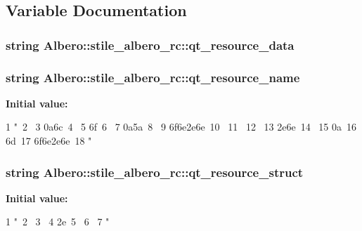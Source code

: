 \subsection{Variable Documentation}
\hypertarget{namespaceAlbero_1_1stile__albero__rc_ac54f331156bbcd4a77eb771964b081a0}{
\subsubsection[{qt\_\-resource\_\-data}]{\setlength{\rightskip}{0pt plus 5cm}string {\bf Albero::stile\_\-albero\_\-rc::qt\_\-resource\_\-data}}}
\label{namespaceAlbero_1_1stile__albero__rc_ac54f331156bbcd4a77eb771964b081a0}
\hypertarget{namespaceAlbero_1_1stile__albero__rc_a17d6fbe19c7ec61ff872f2688ca957f2}{
\subsubsection[{qt\_\-resource\_\-name}]{\setlength{\rightskip}{0pt plus 5cm}string {\bf Albero::stile\_\-albero\_\-rc::qt\_\-resource\_\-name}}}
\label{namespaceAlbero_1_1stile__albero__rc_a17d6fbe19c7ec61ff872f2688ca957f2}
{\bfseries Initial value:}
\begin{DoxyCode}
1 "\
2 \
3 \x0a\x6c\
4 \
5 \x6f\
6 \
7 \x0a\x5a\
8 \
9 \x6f\x6e\x2e\x6e\
10 \
11 \
12 \
13 \x2e\x6e\
14 \
15 \x0a\
16 \x6d\
17 \x6f\x6e\x2e\x6e\
18 "
\end{DoxyCode}
\hypertarget{namespaceAlbero_1_1stile__albero__rc_a47cf969fa3c5f71007adb2af87362eec}{
\subsubsection[{qt\_\-resource\_\-struct}]{\setlength{\rightskip}{0pt plus 5cm}string {\bf Albero::stile\_\-albero\_\-rc::qt\_\-resource\_\-struct}}}
\label{namespaceAlbero_1_1stile__albero__rc_a47cf969fa3c5f71007adb2af87362eec}
{\bfseries Initial value:}
\begin{DoxyCode}
1 "\
2 \x00\
3 \
4 \x2e\
5 \
6 \xce\
7 "
\end{DoxyCode}
